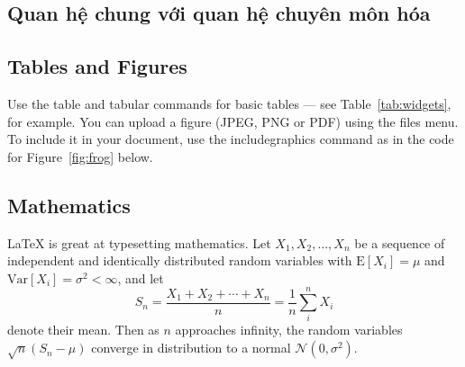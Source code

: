 \subsection{Quan hệ chung với quan hệ chuyên môn hóa}

\subsection{}






\subsection{Tables and Figures}

Use the table and tabular commands for basic tables --- see Table~\ref{tab:widgets}, for example. You can upload a figure (JPEG, PNG or PDF) using the files menu. To include it in your document, use the includegraphics command as in the code for Figure~\ref{fig:frog} below.



\subsection{Mathematics}

\LaTeX{} is great at typesetting mathematics. Let $X_1, X_2, \ldots, X_n$ be a sequence of independent and identically distributed random variables with $\text{E}[X_i] = \mu$ and $\text{Var}[X_i] = \sigma^2 < \infty$, and let
$$S_n = \frac{X_1 + X_2 + \cdots + X_n}{n}
      = \frac{1}{n}\sum_{i}^{n} X_i$$
denote their mean. Then as $n$ approaches infinity, the random variables $\sqrt{n}(S_n - \mu)$ converge in distribution to a normal $\mathcal{N}(0, \sigma^2)$.

